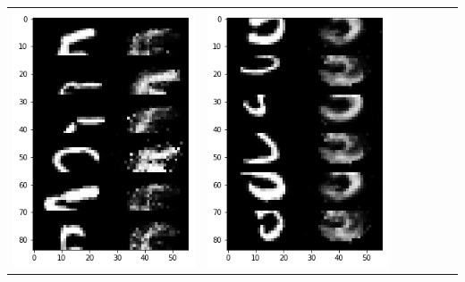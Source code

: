 \documentclass[12pt]{report} %
\begin{document}
\begin{tabular}{m{0.7cm}m{2.4cm}m{2.4cm}m{2.4cm}m{2.4cm}m{2.4cm}m{2.4cm}}
	\includegraphics[scale=0.3]{pictures/M1_5_up.png} & \includegraphics[scale=0.3]{pictures/M1_5_down.png} &

\end{tabular}
\end{document}
